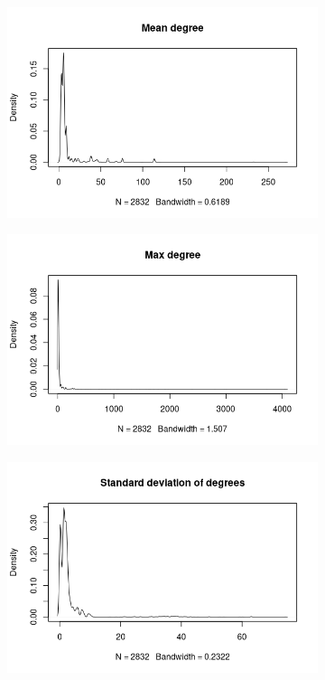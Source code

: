 \documentclass{l4proj}
\theoremstyle{definition}
\theoremstyle{remark}
\begin{document}
\begin{figure}
\begin{subfigure}[t]{0.49\textwidth}
    \includegraphics[width=\textwidth]{images/sip_meandeg.png}
  \end{subfigure}
  \begin{subfigure}[t]{0.49\textwidth}
    \centering
    \includegraphics[width=\textwidth]{images/sip_maxdeg.png}
  \end{subfigure}
  \begin{subfigure}[t]{0.49\textwidth}
    \centering
    \includegraphics[width=\textwidth]{images/sip_stddeg.png}

\end{subfigure}
\end{figure}
\end{document}
